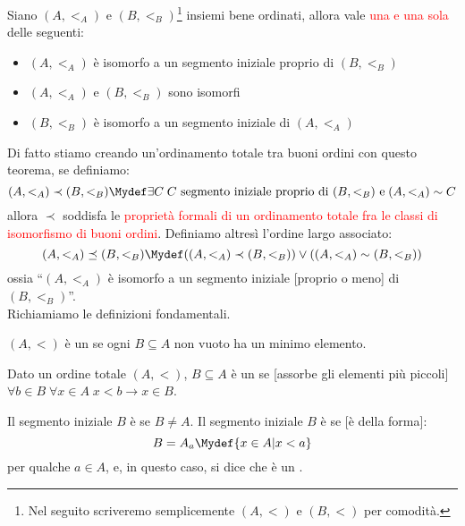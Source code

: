 \documentclass[11pt]{scrartcl}
\begin{document}
\begin{theorem}
	Siano $(A,<_A)$ e $(B,<_B)$\footnote{Nel seguito scriveremo semplicemente $(A,<)$ e $(B,<)$ per comodità.} insiemi bene ordinati, allora vale \textcolor{red}{una e una sola} delle seguenti:
	\begin{itemize}
		\item $(A,<_A)$ è isomorfo a un segmento iniziale proprio di $(B,<_B)$
		\item $(A,<_A)$ e $(B,<_B)$ sono isomorfi
		\item $(B,<_B)$ è isomorfo a un segmento iniziale di $(A,<_A)$
	\end{itemize}
\end{theorem}

Di fatto stiamo creando un'ordinamento totale tra buoni ordini con questo teorema, se definiamo:
\[ (A,<_A) \prec (B,<_B) \Mydef \exists C \; \text{$C$ segmento iniziale proprio di $(B,<_B)$ e} \; (A,<_A) \sim C
	\]
allora $\prec$ soddisfa le \textcolor{red}{proprietà formali di un ordinamento totale fra le classi di isomorfismo di buoni ordini}.
Definiamo altresì l'ordine largo associato:
\[ (A,<_A) \preceq (B,<_B) \Mydef ((A,<_A) \prec (B,<_B)) \lor ((A,<_A) \sim (B,<_B))
	\]
ossia ``$(A,<_A)$ è isomorfo a un segmento iniziale [proprio o meno] di $(B,<_B)$''.\\
Richiamiamo le definizioni fondamentali.

\begin{definition}
	$(A,<)$ è un  se ogni $B \subseteq A$ non vuoto ha un minimo elemento.
\end{definition}

\begin{definition}
	Dato un ordine totale $(A,<)$, $B \subseteq A$ è un  se [assorbe gli elementi più piccoli] $\forall b \in B \; \forall x \in A \; x < b \rightarrow x \in B$.
\end{definition}

\begin{definition}
	Il segmento iniziale $B$ è  se $B \ne A$. Il segmento iniziale $B$ è  se [è della forma]:
	\[ B = A_a \Mydef \{x \in A | x < a\}
		\]
	per qualche $a \in A$, e, in questo caso, si dice  che è un .
\end{definition}
\end{document}
